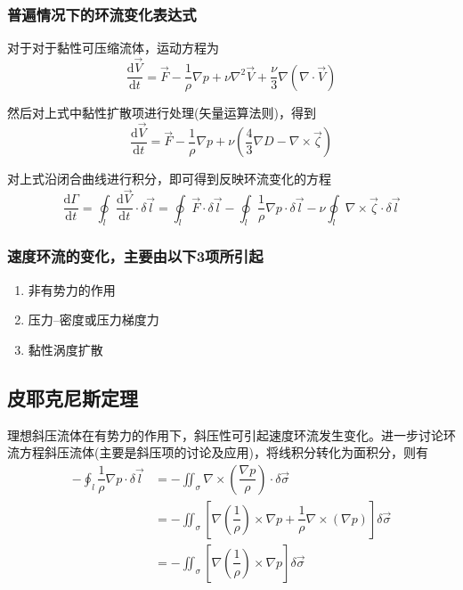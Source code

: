 \documentclass[a4paper,oneside]{ctexbook}
\begin{document}
\subsubsection{普遍情况下的环流变化表达式}

对于对于黏性可压缩流体，运动方程为
\begin{equation}
    \dfrac{\mathrm{d}\overrightarrow{V}}{\mathrm{d}t}=\overrightarrow{F}-\dfrac{1}{\rho}\nabla{p}+\nu\nabla^2\overrightarrow{V}+\dfrac{\nu}{3}\nabla(\nabla\cdot\overrightarrow{V})
\end{equation}

然后对上式中黏性扩散项进行处理(矢量运算法则)，得到
\begin{equation}
    \dfrac{\mathrm{d}\overrightarrow{V}}{\mathrm{d}t}=\overrightarrow{F}-\dfrac{1}{\rho}\nabla{p}+\nu\left(\dfrac{4}{3}\nabla{D}-\nabla\times\overrightarrow{\zeta}\right)
\end{equation}

对上式沿闭合曲线进行积分，即可得到反映环流变化的方程
\begin{equation}
    \dfrac{\mathrm{d}\Gamma}{\mathrm{d}t}=\oint_l\dfrac{\mathrm{d}\overrightarrow{V}}{\mathrm{d}t}\cdot\delta\overrightarrow{l}=\oint_l\overrightarrow{F}\cdot\delta\overrightarrow{l}-\oint_l\dfrac{1}{\rho}\nabla{p}\cdot\delta\overrightarrow{l}-\nu\oint_l\nabla\times\overrightarrow{\zeta}\cdot\delta\overrightarrow{l}
\end{equation}

\subsubsection{速度环流的变化，主要由以下3项所引起}
\begin{enumerate}
    \item 非有势力的作用
    \item 压力--密度或压力梯度力
    \item 黏性涡度扩散
\end{enumerate}

\subsection{皮耶克尼斯定理}

理想斜压流体在有势力的作用下，斜压性可引起速度环流发生变化。进一步讨论环流方程斜压流体(主要是斜压项的讨论及应用)，将线积分转化为面积分，则有
\begin{equation}
    \begin{aligned}
    -\oint_l\dfrac{1}{\rho}\nabla{p}\cdot\delta\overrightarrow{l}&=-\iint_\sigma\nabla\times(\dfrac{\nabla{p}}{\rho})\cdot\delta\overrightarrow{\sigma}\\
    &=-\iint_\sigma[\nabla(\dfrac{1}{\rho})\times\nabla{p}+\dfrac{1}{\rho}\nabla\times(\nabla{p})]\delta\overrightarrow{\sigma}\\
    &=-\iint_\sigma[\nabla(\dfrac{1}{\rho})\times\nabla{p}]\delta\overrightarrow{\sigma}
    \end{aligned}
\end{equation}
\end{document}
